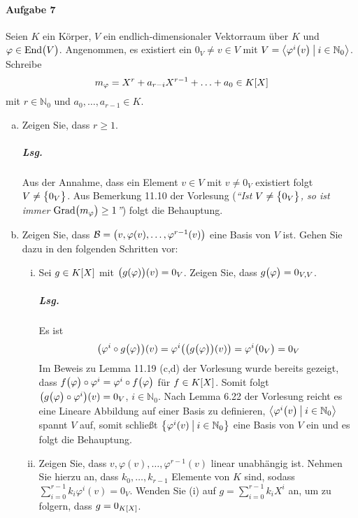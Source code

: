 \documentclass{scrreprt}
\newcommand{\End}{\text{End}}
\newcommand{\Grad}{\text{Grad}}
\begin{document}
\paragraph{Aufgabe 7} Seien $K$ ein Körper, $V$ ein endlich-dimensionaler
Vektorraum über $K$ und $\varphi \in \End\qty\big(V)$.
Angenommen, es existiert ein $0_V \ne v \in V$ mit $V = \left\langle
  \varphi^i\qty\big(v) \:{\big |}\: i \in \mathbb{N}_0
\right\rangle$.
Schreibe
\[
  m_{\varphi} = X^r + a_{r - i}X^{r - 1} + \ldots + a_0 \in K\qty[X]
\]
mit $r \in \mathbb{N}_0$ und $a_0, \ldots, a_{r - 1} \in K$.
\begin{enumerate}[(a)]
\item Zeigen Sie, dass $r \geq 1$.

  \subparagraph{Lsg.} Aus der Annahme, dass ein Element $v \in V$ mit
  $v \ne 0_V$ existiert folgt $V \ne \qty\big{0_V}$.
  Aus Bemerkung 11.10 der Vorlesung (\emph{``Ist $V \ne \qty\big{0_V}$, so ist
    immer $\Grad\qty\big(m_{\varphi}) \geq 1$''}) folgt die Behauptung.

\item Zeigen Sie, dass $\mathcal{B} = \qty\big(
    v, \varphi(v), \ldots, \varphi^{r - 1}(v)
  )$ eine Basis von $V$ ist.
  Gehen Sie dazu in den folgenden Schritten vor:
  \begin{enumerate}[(i)]
  \item Sei $g \in K\qty[X]$ mit $\qty\big(g(\varphi))(v) = 0_V$.
    Zeigen Sie, dass $g\qty\big(\varphi) = 0_{V, V}$.

    \subparagraph{Lsg.} Es ist
    \[
      \qty(\varphi^i \circ g\qty\big(\varphi))(v) =
      \varphi^i\qty(\qty(g\qty\big(\varphi))(v)) = \varphi^i\qty\big(0_V) = 0_V
    \]
    Im Beweis zu Lemma 11.19 (c,d) der Vorlesung wurde
    bereits gezeigt, dass
    $f\qty\big(\varphi) \circ \varphi^i = \varphi^i \circ f\qty\big(\varphi)$
    für $f \in K\qty[X]$.
    Somit folgt $ \qty(g\qty\big(\varphi) \circ \varphi^i)(v) = 0_V$,
    $i \in \mathbb{N}_0$.
    Nach Lemma 6.22 der Vorlesung reicht es eine Lineare Abbildung auf einer
    Basis zu definieren, $\left\langle
      \varphi^i\qty\big(v) \:{\big |}\: i \in \mathbb{N}_0
    \right\rangle$ spannt $V$ auf, somit schließt
    $\qty\big{\varphi^i(v) \:\big |\: i \in \mathbb{N}_0}$ eine Basis von $V$ ein
    und es folgt die Behauptung.

  \item Zeigen Sie, dass $v, \varphi(v), \ldots, \varphi^{r - 1}(v)$ linear
    unabhängig ist.
    Nehmen Sie hierzu an, dass $k_0, \ldots, k_{r - 1}$ Elemente von $K$ sind,
    sodass $\sum_{i = 0}^{r - 1} k_i\varphi^i(v) = 0_V$.
    Wenden Sie (i) auf $g = \sum_{i = 0}^{r - 1} k_iX^i$ an, um zu folgern, dass
    $g = 0_{K\qty[X]}$.


\end{enumerate}
\end{enumerate}
\end{document}
